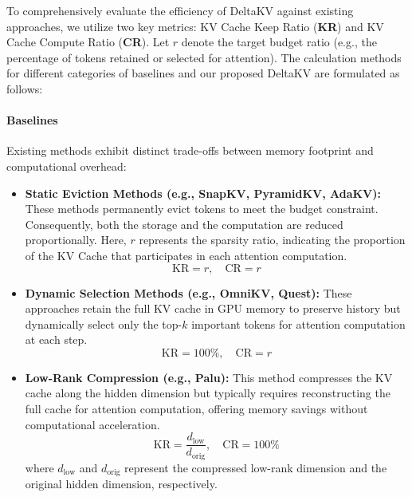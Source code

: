 To comprehensively evaluate the efficiency of DeltaKV against existing approaches, we utilize two key metrics: KV Cache Keep Ratio (\textbf{KR}) and KV Cache Compute Ratio (\textbf{CR}). Let $r$ denote the target budget ratio (e.g., the percentage of tokens retained or selected for attention). The calculation methods for different categories of baselines and our proposed DeltaKV are formulated as follows:

\paragraph{Baselines}
Existing methods exhibit distinct trade-offs between memory footprint and computational overhead:
\begin{itemize}[nolistsep, left=0pt]
  \item \textbf{Static Eviction Methods (e.g., SnapKV, PyramidKV, AdaKV):} These methods permanently evict tokens to meet the budget constraint. Consequently, both the storage and the computation are reduced proportionally. Here, $r$ represents the sparsity ratio, indicating the proportion of the KV Cache that participates in each attention computation.
  \begin{equation}
    \text{KR} = r, \quad \text{CR} = r
  \end{equation}
    
  \item \textbf{Dynamic Selection Methods (e.g., OmniKV, Quest):} These approaches retain the full KV cache in GPU memory to preserve history but dynamically select only the top-$k$ important tokens for attention computation at each step.
  \begin{equation}
    \text{KR} = 100\%, \quad \text{CR} = r
  \end{equation}
    
  \item \textbf{Low-Rank Compression (e.g., Palu):} This method compresses the KV cache along the hidden dimension but typically requires reconstructing the full cache for attention computation, offering memory savings without computational acceleration.
  \begin{equation}
    \text{KR} = \frac{d_{\text{low}}}{d_{\text{orig}}}, \quad \text{CR} = 100\%
  \end{equation}
  where $d_{\text{low}}$ and $d_{\text{orig}}$ represent the compressed low-rank dimension and the original hidden dimension, respectively.
\end{itemize}

